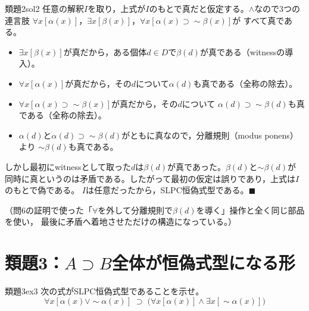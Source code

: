 \documentclass[autodetect-engine,dvi=dvipdfmx,ja=standard]{bxjsarticle}
\begin{document}
\begin{solution}{類題2}{sol2}
任意の解釈\(I\)を取り，上式が\(I\)のもとで真だと仮定する。\(\land\)なので3つの連言肢
\(\forall x[\alpha(x)]\)，\(\exists x[\beta(x)]\)，\(\forall x[\alpha(x)\supset\sim\beta(x)]\)が
すべて真である。

\begin{itemize}
  \item \(\exists x[\beta(x)]\)が真だから，ある個体\(d\in D\)で\(\beta(d)\)が真である（witnessの導入）。
  \item \(\forall x[\alpha(x)]\)が真だから，その\(d\)について\(\alpha(d)\)も真である（全称の除去）。
  \item \(\forall x[\alpha(x)\supset\sim\beta(x)]\)が真だから，その\(d\)について
    \(\alpha(d)\supset\sim\beta(d)\)も真である（全称の除去）。
  \item \(\alpha(d)\)と\(\alpha(d)\supset\sim\beta(d)\)がともに真なので，分離規則（modus ponens）より
    \(\sim\beta(d)\)も真である。
\end{itemize}
しかし最初にwitnessとして取った\(d\)は\(\beta(d)\)が真であった。\(\beta(d)\)と\(\sim\beta(d)\)が
同時に真というのは矛盾である。したがって最初の仮定は誤りであり，上式は\(I\)のもとで偽である。
\(I\)は任意だったから，SLPC恒偽式型である。\hfill\(\blacksquare\)

（問6の証明で使った「\(\forall\)を外して分離規則で\(\beta(d)\)を導く」操作と全く同じ部品を使い，
最後に矛盾へ着地させただけの構造になっている。）
\end{solution}

\section{類題3：\(A\supset B\)全体が恒偽式型になる形}

\begin{exercise}{類題3}{ex3}
次の式がSLPC恒偽式型であることを示せ。
\[
  \forall x[\alpha(x)\lor\sim\alpha(x)]
  \;\supset\;
  \bigl(\forall x[\alpha(x)]\land\exists x[\sim\alpha(x)]\bigr)
\]
\end{exercise}
\end{document}
